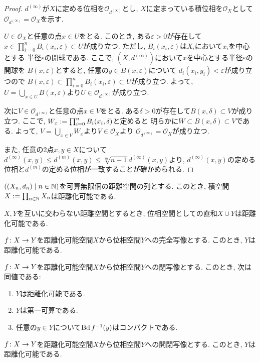 \documentclass[uplatex, dvipdfmx, a4paper, 12pt, class=jsbook, crop=false]{standalone}
\begin{document}
\begin{proof}
	$ d^{(\infty)} $が$ X $に定める位相を$ \mathcal{O}_{d^{(\infty)}} $とし,
	$ X $に定まっている積位相を$ \mathcal{O}_X $として
	$ \mathcal{O}_{d^{(\infty)}} = \mathcal{O}_X $を示す.

	$ U \in \mathcal{O}_X $と任意の点$ x \in U $をとる.
	このとき, ある$ \varepsilon > 0 $が存在して
	$ x \in \prod_{i=0}^n B_i(x_i, \varepsilon) \subset U $が成り立つ.
	ただし, $ B_i(x_i, \varepsilon) $は$ X_i $において$ x_i $を中心とする
	半径$ \varepsilon $の開球である.
	ここで, $ (X, d^{(\infty)}) $において$ x $を中心とする半径$ \varepsilon $の開球を
	$ B(x, \varepsilon) $とすると, 任意の$ y \in B(x, \varepsilon) $について
	$ d_i(x_i, y_i) < \varepsilon $が成り立つので
	$ B(x, \varepsilon) \subset \prod_{i=0}^n B_i(x_i, \varepsilon) \subset U $が成り立つ.
	よって, $ U = \bigcup_{x \in U} B(x, \varepsilon) $より$ U \in \mathcal{O}_{d^{(\infty)}} $が成り立つ.

	次に$ V \in \mathcal{O}_{d^{(\infty)}} $と任意の点$ x \in V $をとる.
	ある$ \delta > 0 $が存在して$ B(x, \delta) \subset V $が成り立つ.
	ここで, $ W_x \mathrel{:=} \prod_{i=0}^n B_i(x_i, \delta) $と定めると
	明らかに$ W \subset B(x, \delta) \subset V $である.
	よって, $ V = \bigcup_{x \in V} W_x $より$ V \in \mathcal{O}_X $より
	$ \mathcal{O}_{d^{(\infty)}} = \mathcal{O}_X $が成り立つ.

	また, 任意の2点$ x, y \in X $について$ d^{(\infty)}(x, y) \leq
	d^{(m)}(x, y) \leq \sqrt[m]{n+1} d^{(\infty)}(x, y)$より,
	$ d^{(\infty)}(x, y) $の定める位相と$ d^{(m)} $の定める位相が一致することが確かめられる.
\end{proof}

\begin{proposition}
	$ \setfamily{(X_n, d_n)}{n \in \N} $を可算無限個の距離空間の列とする.
	このとき, 積空間$ X \mathrel{:=} \prod_{n \in \mathbb{N}} X_n $は距離化可能である.
\end{proposition}

\begin{proposition}
	$ X, Y $を互いに交わらない距離空間とするとき,
	位相空間としての直和$ X \cup Y $は距離化可能である.
\end{proposition}

\begin{proposition}
	$ f\colon X\to Y $を距離化可能空間$ X $から位相空間$ Y $への完全写像とする.
	このとき, $ Y $は距離化可能である.
\end{proposition}

\begin{theorem}
	$ f\colon X\to Y $を距離化可能空間$ X $から位相空間$ Y $への閉写像とする.
	このとき, 次は同値である:
	\begin{enumerate}
		\item $ Y $は距離化可能である.
		\item $ Y $は第一可算である.
		\item 任意の$ y \in Y $について$ \topbd \mapinvpt{f}{y} $はコンパクトである.
	\end{enumerate}
\end{theorem}

\begin{proposition}
	$ f\colon X\to Y $を距離化可能空間$ X $から位相空間$ Y $への開閉写像とする.
	このとき, $ Y $は距離化可能である.
\end{proposition}
\end{document}
